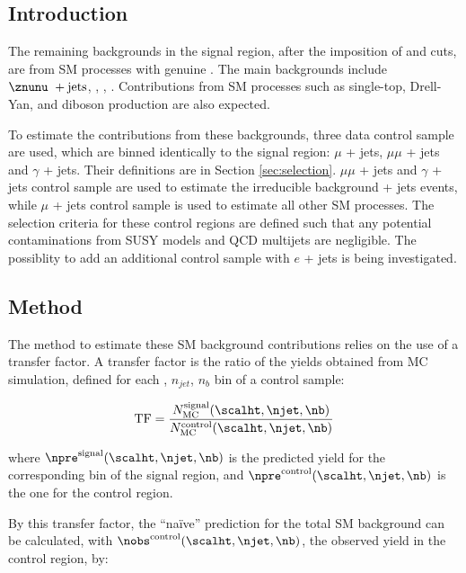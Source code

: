 \subsection{Introduction}

The remaining backgrounds in the signal region, after the imposition
of \alphat and \mhtmet cuts, are from SM processes with genuine
\met. The main backgrounds include $\znunu\ + \textrm{jets}$, \wj,
\zj, \ttbar. Contributions from SM processes such as single-top,
Drell-Yan, and diboson production are also expected.

To estimate the contributions from these backgrounds, three data
control sample are used, which are binned identically to the signal
region: $\mu$ + jets, $\mu\mu$ + jets and $\gamma$ + jets. Their
definitions are in Section \ref{sec:selection}. $\mu\mu$ + jets and
$\gamma$ + jets control sample are used to estimate the irreducible
background \znunu + jets events, while $\mu$ + jets control sample is
used to estimate all other SM processes. The selection criteria for
these control regions are defined such that any potential
contaminations from SUSY models and QCD multijets are negligible. The
possiblity to add an additional control sample with $e$ + jets is
being investigated.

\subsection{Method}
\label{sec:ewk-method}

The method to estimate these SM background contributions relies on the
use of a transfer factor. A transfer factor is the ratio of the yields
obtained from MC simulation, defined for each \scalht, $n_{jet}$,
$n_b$ bin of a control sample:

\begin{equation}
  \label{equ:tf-ratio}
  {\rm TF} = \frac{N_{\rm MC}^{\rm signal}(\scalht,\njet,\nb)}{N_{\rm
      MC}^{\rm control}(\scalht,\njet,\nb)} 
\end{equation}

where $\npre^{\rm signal}(\scalht,\njet,\nb)$ is the predicted yield
for the corresponding bin of the signal region, and $\npre^{\rm
  control}(\scalht,\njet,\nb)$ is the one for the control region.

By this transfer factor, the ``na\"ive'' prediction for the total SM
background can be calculated, with $\nobs^{\rm
  control}(\scalht,\njet,\nb)$, the observed yield in the control
region, by:

